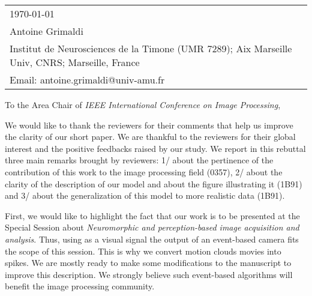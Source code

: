 \documentclass[9pt]{article}
\makeatletter
\newcommand{\AuthorAG}{Antoine Grimaldi}
\newcommand{\EmailAG}{antoine.grimaldi@univ-amu.fr}
\newcommand{\Address}{Institut de Neurosciences de la Timone (UMR 7289); Aix Marseille Univ, CNRS; Marseille, France}%
\newcommand{\Journal}{IEEE International Conference on Image Processing}%
\makeatother
\begin{document}
\hrulefill

\vspace{.1\baselineskip}

\begin{tabular}[b]{@{} l @{}}
  \today\\[12pt] %

\AuthorAG\ \\

\Address\\%
  Email: \EmailAG %

\end{tabular}

\hrulefill

\vspace{1\baselineskip}

To the Area Chair of \emph{\Journal},%

\vspace{2\baselineskip}

We would like to thank the reviewers for their comments that help us improve the clarity of our short paper. We are thankful to the reviewers for their global interest and the positive feedbacks raised by our study. %
We report in this rebuttal three main remarks brought by reviewers: 1/ about the pertinence of the contribution of this work to the image processing field (0357), 2/ about the clarity of the description of our model and about the figure illustrating it (1B91) and 3/ about the generalization of this model to more realistic data (1B91). 

First, we would like to highlight the fact that our work is to be presented at the Special Session about \textit{Neuromorphic and perception-based image acquisition and analysis}. Thus, using as a visual signal the output of an event-based camera fits the scope of this session. This is why we convert motion clouds movies into spikes. We are mostly ready to make some modifications to the manuscript to improve this description. We strongly believe such event-based algorithms will benefit the image processing community. 
\end{document}
